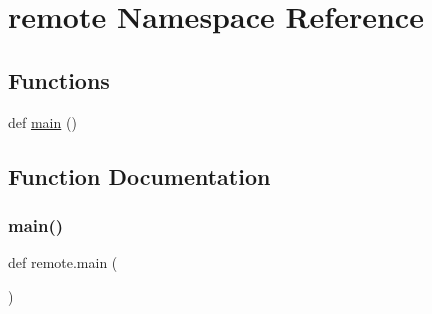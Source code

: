 \hypertarget{namespaceremote}{}\section{remote Namespace Reference}
\label{namespaceremote}
\subsection*{Functions}
\begin{DoxyCompactItemize}
\item 
def \hyperlink{namespaceremote_aa8eb15effdae452b1fde3639cd9bc267}{main} ()
\end{DoxyCompactItemize}


\subsection{Function Documentation}
\mbox{\label{namespaceremote_aa8eb15effdae452b1fde3639cd9bc267}} 
\subsubsection{\texorpdfstring{main()}{main()}}
{\footnotesize\ttfamily def remote.\+main (\begin{DoxyParamCaption}{ }\end{DoxyParamCaption})}

